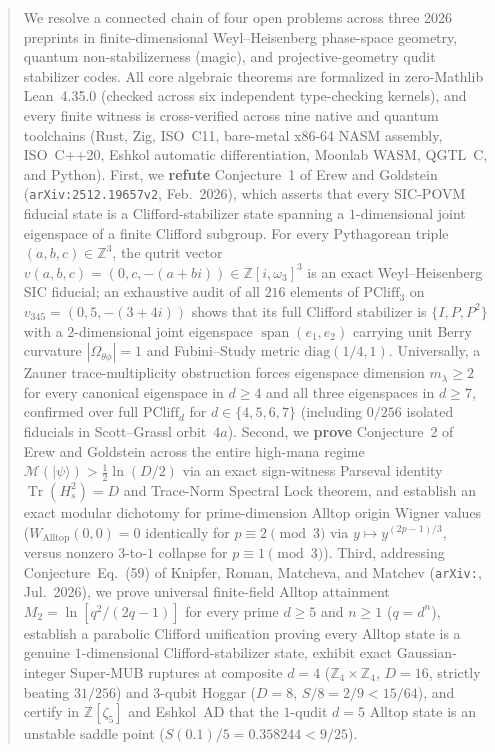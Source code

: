 \documentclass[11pt,letterpaper]{article}
\theoremstyle{plain}
\theoremstyle{definition}
\theoremstyle{remark}
\newcommand{\Z}{\mathbb{Z}}
\newcommand{\Tr}{\operatorname{Tr}}
\newcommand{\Span}{\operatorname{span}}
\newcommand{\PCliff}{\mathrm{PCliff}}
\newcommand{\Mana}{\mathcal{M}}
\newcommand{\ket}[1]{\lvert #1 \rangle}
\begin{document}
\begin{abstract}
We resolve a connected chain of four open problems across three 2026 preprints in finite-dimensional Weyl--Heisenberg phase-space geometry, quantum non-stabilizerness (magic), and projective-geometry qudit stabilizer codes. All core algebraic theorems are formalized in zero-Mathlib Lean~4.35.0 (checked across six independent type-checking kernels), and every finite witness is cross-verified across nine native and quantum toolchains (Rust, Zig, ISO~C11, bare-metal x86-64 NASM assembly, ISO~C++20, Eshkol automatic differentiation, Moonlab WASM, QGTL~C, and Python).
First, we \textbf{refute} Conjecture~1 of Erew and Goldstein (\texttt{arXiv:\allowbreak 2512.19657v2}, Feb.~2026), which asserts that every SIC-POVM fiducial state is a Clifford-stabilizer state spanning a $1$-dimensional joint eigenspace of a finite Clifford subgroup. For every Pythagorean triple $(a,b,c)\in\Z^3$, the qutrit vector $v(a,b,c)=(0,c,-(a+bi))\in\Z[i,\omega_3]^3$ is an exact Weyl--Heisenberg SIC fiducial; an exhaustive audit of all $216$ elements of $\PCliff_3$ on $v_{345}=(0,5,-(3+4i))$ shows that its full Clifford stabilizer is $\{I,P,P^2\}$ with a $2$-dimensional joint eigenspace $\Span(e_1,e_2)$ carrying unit Berry curvature $|\Omega_{\theta\phi}|=1$ and Fubini--Study metric $\mathrm{diag}(1/4,1)$. Universally, a Zauner trace-multiplicity obstruction forces eigenspace dimension $m_\lambda\ge 2$ for every canonical eigenspace in $d\ge 4$ and all three eigenspaces in $d\ge 7$, confirmed over full $\PCliff_d$ for $d\in\{4,5,6,7\}$ (including $0/256$ isolated fiducials in Scott--Grassl orbit~$4a$).
Second, we \textbf{prove} Conjecture~2 of Erew and Goldstein across the entire high-mana regime $\Mana(\ket{\psi})>\tfrac{1}{2}\ln(D/2)$ via an exact sign-witness Parseval identity $\Tr(H_s^2)=D$ and Trace-Norm Spectral Lock theorem, and establish an exact modular dichotomy for prime-dimension Alltop origin Wigner values ($W_{\mathrm{Alltop}}(0,0)=0$ identically for $p\equiv 2\pmod 3$ via $y\mapsto y^{(2p-1)/3}$, versus nonzero $3$-to-$1$ collapse for $p\equiv 1\pmod 3$).
Third, addressing Conjecture~Eq.~(59) of Knipfer, Roman, Matcheva, and Matchev (\texttt{arXiv:}, Jul.~2026), we prove universal finite-field Alltop attainment $M_2=\ln[q^2/(2q-1)]$ for every prime $d\ge 5$ and $n\ge 1$ ($q=d^n$), establish a parabolic Clifford unification proving every Alltop state is a genuine $1$-dimensional Clifford-stabilizer state, exhibit exact Gaussian-integer Super-MUB ruptures at composite $d=4$ ($\Z_4\times\Z_4$, $D=16$, strictly beating $31/256$) and $3$-qubit Hoggar ($D=8$, $S/8=2/9<15/64$), and certify in $\Z[\zeta_5]$ and Eshkol~AD that the $1$-qudit $d=5$ Alltop state is an unstable saddle point ($S(0.1)/5=0.358244<9/25$).

\end{abstract}
\end{document}
